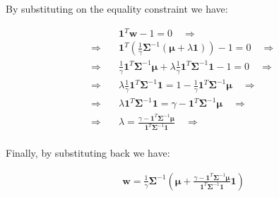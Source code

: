 \documentclass{beamer}
\begin{document}
\begin{frame}

\justifying
By substituting on the equality constraint we have:

\justifying
\begin{equation*}
\begin{aligned}
	& \mathbf{1}^{T}\mathbf{w} - 1 = 0 \quad \Rightarrow \\
	\Rightarrow \quad & \mathbf{1}^{T} \left(\frac{1}{\gamma} \mathbf{\Sigma}^{-1} \left(\boldsymbol\mu + \lambda \mathbf{1}\right)\right) - 1 = 0 \quad \Rightarrow \\
	\Rightarrow \quad & \frac{1}{\gamma}\mathbf{1}^{T}\mathbf{\Sigma}^{-1}\boldsymbol\mu + \lambda \frac{1}{\gamma} \mathbf{1}^{T} \mathbf{\Sigma}^{-1}\mathbf{1} - 1 = 0 \quad \Rightarrow \\
	\Rightarrow \quad & \lambda \frac{1}{\gamma} \mathbf{1}^{T} \mathbf{\Sigma}^{-1}\mathbf{1} = 1 -  \frac{1}{\gamma}\mathbf{1}^{T}\mathbf{\Sigma}^{-1}\boldsymbol\mu \quad \Rightarrow \\
	\Rightarrow \quad & \lambda \mathbf{1}^{T} \mathbf{\Sigma}^{-1}\mathbf{1} = \gamma - \mathbf{1}^{T}\mathbf{\Sigma}^{-1}\boldsymbol\mu \quad \Rightarrow \\
	\Rightarrow \quad & \lambda = \frac{\gamma - \mathbf{1}^{T}\mathbf{\Sigma}^{-1}\boldsymbol\mu}{\mathbf{1}^{T} \mathbf{\Sigma}^{-1}\mathbf{1}} \quad \Rightarrow \\
\end{aligned}
\end{equation*}

\vspace{0.2cm}
\justifying
Finally, by substituting back we have:

\justifying
\begin{equation*}
\begin{aligned}
	\mathbf{w} = \frac{1}{\gamma} \mathbf{\Sigma}^{-1} \left(\boldsymbol\mu + \frac{\gamma - \mathbf{1}^{T}\mathbf{\Sigma}^{-1}\boldsymbol\mu}{\mathbf{1}^{T} \mathbf{\Sigma}^{-1}\mathbf{1}} \mathbf{1}\right)
\end{aligned}
\end{equation*}

\end{frame}
\end{document}
